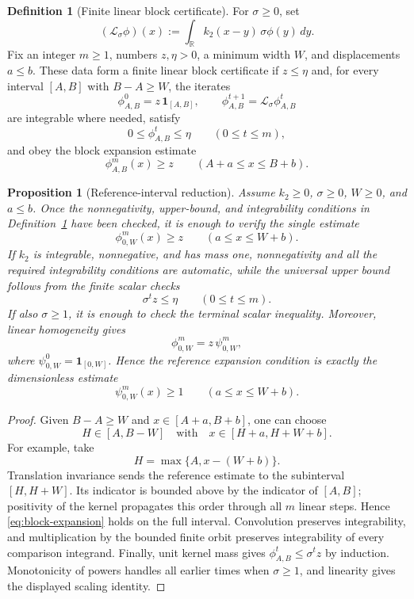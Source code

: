 \documentclass[11pt]{article}
\newtheorem{proposition}[theorem]{Proposition}
\theoremstyle{definition}
\newtheorem{definition}[theorem]{Definition}
\newcommand{\R}{\mathbb R}
\begin{document}
\begin{definition}[Finite linear block certificate]
\label{def:finite-block-certificate}
For \(\sigma\geq0\), set
\[
  (\mathcal L_\sigma\phi)(x)
  :=
  \int_{\R}k_2(x-y)\,\sigma\phi(y)\,dy.
\]
Fix an integer \(m\geq1\), numbers \(z,\eta>0\), a minimum width
\(W\), and displacements \(a\leq b\).  These data form a finite linear block
certificate if \(z\leq\eta\) and, for every interval
\([A,B]\) with \(B-A\geq W\), the iterates
\[
  \phi_{A,B}^{0}=z\,\mathbf 1_{[A,B]},
  \qquad
  \phi_{A,B}^{t+1}=\mathcal L_\sigma\phi_{A,B}^{t}
\]
are integrable where needed, satisfy
\[
  0\leq\phi_{A,B}^{t}\leq\eta
  \qquad(0\leq t\leq m),
\]
and obey the block expansion estimate
\begin{equation}\label{eq:block-expansion}
  \phi_{A,B}^{m}(x)\geq z
  \qquad
  (A+a\leq x\leq B+b).
\end{equation}
\end{definition}

\begin{proposition}[Reference-interval reduction]
\label{prop:reference-block}
Assume \(k_2\geq0\), \(\sigma\geq0\), \(W\geq0\), and \(a\leq b\).
Once the nonnegativity, upper-bound, and integrability conditions in
Definition~\ref{def:finite-block-certificate} have been checked, it is enough
to verify the single estimate
\[
  \phi_{0,W}^{m}(x)\geq z
  \qquad(a\leq x\leq W+b).
\]
If \(k_2\) is integrable, nonnegative, and has mass one, nonnegativity and all
the required integrability conditions are automatic, while the universal
upper bound follows from the finite scalar checks
\[
  \sigma^t z\leq\eta
  \qquad(0\leq t\leq m).
\]
If also \(\sigma\geq1\), it is enough to check the terminal scalar inequality.
Moreover, linear homogeneity gives
\[
  \phi_{0,W}^{m}
  =
  z\,\psi_{0,W}^{m},
\]
where \(\psi^0_{0,W}=\mathbf 1_{[0,W]}\).  Hence the reference expansion
condition is exactly the dimensionless estimate
\[
  \psi_{0,W}^{m}(x)\geq1
  \qquad(a\leq x\leq W+b).
\]
\end{proposition}

\begin{proof}
Given \(B-A\geq W\) and \(x\in[A+a,B+b]\), one can choose
\[
  H\in[A,B-W]
  \quad\text{with}\quad
  x\in[H+a,H+W+b].
\]
For example, take
\[
  H=\max\{A,x-(W+b)\}.
\]
Translation invariance sends the reference estimate to the subinterval
\([H,H+W]\).  Its indicator is bounded above by the indicator of \([A,B]\);
positivity of the kernel propagates this order through all \(m\) linear
steps.  Hence \eqref{eq:block-expansion} holds on the full interval.
Convolution preserves integrability, and multiplication by the bounded
finite orbit preserves integrability of every comparison integrand.  Finally,
unit kernel mass gives \(\phi_{A,B}^t\leq\sigma^t z\) by induction.
Monotonicity of powers handles all earlier times when \(\sigma\geq1\), and
linearity gives the displayed scaling identity.
\end{proof}
\end{document}
